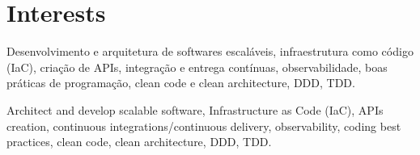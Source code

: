 \documentclass[letterpaper]{twentysecondcv} %
\begin{document}

\section{Interests}
\vspace{-0.15cm}
\begin{adjustwidth}{0.5em}{0.0em}
	Desenvolvimento e arquitetura de softwares escaláveis, infraestrutura
	como código (IaC), criação de APIs, integração e entrega contínuas,
	observabilidade, boas práticas de programação, clean code e clean
	architecture, DDD, TDD.

	Architect and develop scalable software, Infrastructure as Code (IaC), 
	APIs creation, continuous integrations/continuous delivery, observability, 
	coding best practices, clean code, clean architecture, DDD, TDD.
\end{adjustwidth}
\vspace{0.3cm}

\end{document}
